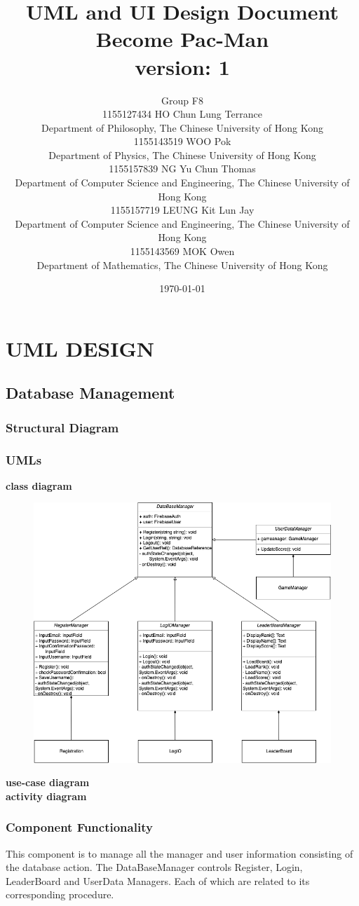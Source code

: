 \documentclass[11pt]{article}
\title{UML and UI Design Document\\Become Pac-Man\\version: 1}
\author{Group F8\\1155127434 HO Chun Lung Terrance\\
Department of Philosophy, The Chinese University of Hong Kong\\1155143519 WOO Pok\\
Department of Physics, The Chinese University of Hong Kong\\1155157839 NG Yu Chun Thomas\\
Department of Computer Science and Engineering, The Chinese University of Hong Kong\\1155157719 LEUNG Kit Lun Jay\\
Department of Computer Science and Engineering, The Chinese University of Hong Kong\\1155143569 MOK Owen\\
Department of Mathematics, The Chinese University of Hong Kong}
\date{\today}
\begin{document}
\maketitle
\tableofcontents
\newpage
\section{UML DESIGN}

\subsection{Database Management}
\subsubsection{Structural Diagram}
\subsubsection{UMLs}
\textbf{class diagram}\\
\begin{figure}[H]
    \centering
    \includegraphics*[scale=0.4]{Database_Class.drawio.png}
\end{figure}
\textbf{use-case diagram}\\
\textbf{activity diagram}\\
\subsubsection{Component Functionality}
This component is to manage all the manager and user information consisting of the database action. The DataBaseManager controls Register, Login, LeaderBoard and UserData Managers. Each of which are related to its corresponding procedure.
\end{document}

